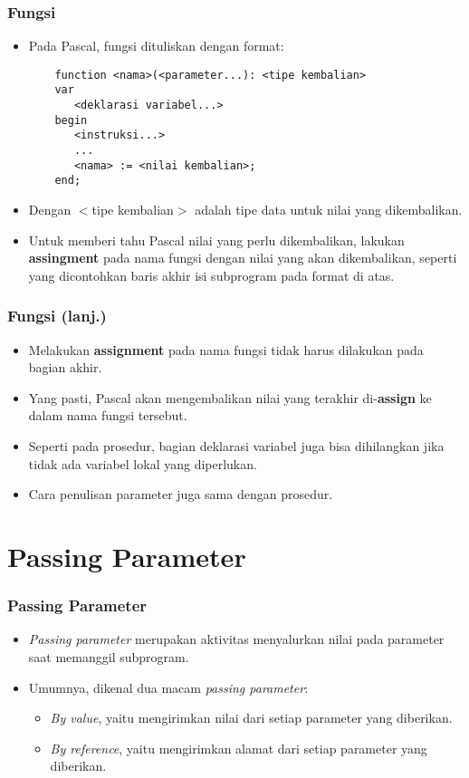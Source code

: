 \documentclass{beamer}
\begin{document}
\begin{frame}[fragile]
\frametitle{Fungsi}
\begin{itemize}
	\item Pada Pascal, fungsi dituliskan dengan format:
	\begin{lstlisting}
	function <nama>(<parameter...): <tipe kembalian>
	var
	   <deklarasi variabel...>
	begin
	   <instruksi...>
	   ...
	   <nama> := <nilai kembalian>;
	end;
	\end{lstlisting}
	\item Dengan $<$tipe kembalian$>$ adalah tipe data untuk nilai yang dikembalikan.
	\item Untuk memberi tahu Pascal nilai yang perlu dikembalikan, lakukan \textbf{assingment} pada nama fungsi dengan nilai yang akan dikembalikan, seperti yang dicontohkan baris akhir isi subprogram pada format di atas.
\end{itemize}
\end{frame}

\begin{frame}
\frametitle{Fungsi (lanj.)}
\begin{itemize}
	\item Melakukan \textbf{assignment} pada nama fungsi tidak harus dilakukan pada bagian akhir.
	\item Yang pasti, Pascal akan mengembalikan nilai yang terakhir di-\textbf{assign} ke dalam nama fungsi tersebut.
	\item Seperti pada prosedur, bagian deklarasi variabel juga bisa dihilangkan jika tidak ada variabel lokal yang diperlukan.
	\item Cara penulisan parameter juga sama dengan prosedur.
\end{itemize}
\end{frame}

\section{Passing Parameter}
\frame{\sectionpage}

\begin{frame}
\frametitle{Passing Parameter}
\begin{itemize}
	\item \textit{Passing parameter} merupakan aktivitas menyalurkan nilai pada parameter saat memanggil subprogram.
	\item Umumnya, dikenal dua macam \textit{passing parameter}:
	\begin{itemize}
		\item \textit{By value}, yaitu mengirimkan \alert{nilai} dari setiap parameter yang diberikan.
		\item \textit{By reference}, yaitu mengirimkan \alert{alamat} dari setiap parameter yang diberikan.
	\end{itemize}
\end{itemize}
\end{frame}
\end{document}
